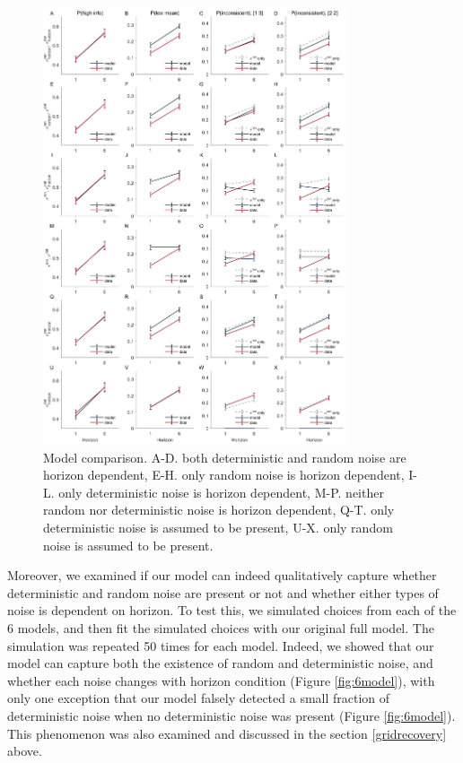 \documentclass[12pt]{article}
\begin{document}
	\begin{figure}[hp]
		\begin{center}
			\includegraphics[width=0.8\textwidth]{figures/RDBayes_2noise_6modelcomparison.jpg}
			\caption{
				Model comparison. A-D. both deterministic and random noise are horizon dependent, E-H. only random noise is horizon dependent, I-L. only deterministic noise is horizon dependent, M-P. neither random nor deterministic noise is horizon dependent, Q-T. only deterministic noise is assumed to be present, U-X. only random noise is assumed to be present.}
			\label{fig:posteriorcheck6models}
		\end{center}
	\end{figure}
	

	Moreover, we examined if our model can indeed qualitatively capture whether deterministic and random noise are present or not and whether either types of noise is dependent on horizon. To test this, we simulated choices from each of the 6 models, and then fit the simulated choices with our original full model. The simulation was repeated 50 times for each model. Indeed, we showed that our model can capture both the existence of random and deterministic noise, and whether each noise changes with horizon condition (Figure \ref{fig:6model}), with only one exception that our model falsely detected a small fraction of deterministic noise when no deterministic noise was present (Figure \ref{fig:6model}). This phenomenon was also examined and discussed in the section \ref{gridrecovery} above.
	
\end{document}
